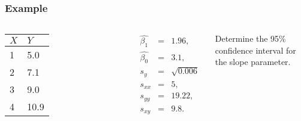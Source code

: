 \begin{frame}
  \frametitle{Example}

    \begin{columns}

      \begin{tabular}{l|l}
        $X$ & $Y$ \\ \hline
        1 & 5.0 \\
        2 & 7.1 \\
        3 & 9.0 \\
        4 & 10.9 \\
      \end{tabular}


      \begin{eqnarray*}
        \hat{\beta_1} & = & 1.96, \\
        \hat{\beta_0} & = & 3.1, \\
        s_y & = & \sqrt{0.006} \\
        s_{xx} & = & 5, \\
        s_{yy} & = & 19.22, \\
        s_{xy} & = & 9.8. 
      \end{eqnarray*}



      Determine the 95\% confidence interval for the slope parameter.

    \end{columns}


\end{frame}


